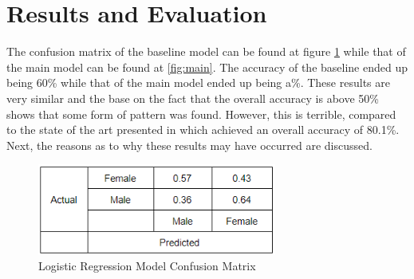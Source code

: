 \section{Results and Evaluation}
The confusion matrix of the baseline model can be found at figure \ref{fig:baseline} while that of the main model can be found at \ref{fig:main}. The accuracy of the baseline ended up being 60\% while that of the main model ended up being a\%. These results are very similar and the base on the fact that the overall accuracy is above 50\% shows that some form of pattern was found. However, this is terrible, compared to the state of the art presented in \cite{2} which achieved an overall accuracy of 80.1\%. Next, the reasons as to why these results may have occurred are discussed.

\begin{figure} \label{fig:baseline}
	\centering
	\includegraphics[width=0.7\textwidth]{Images/LR-CM.png}
	\caption{Logistic Regression Model Confusion Matrix}
\end{figure}